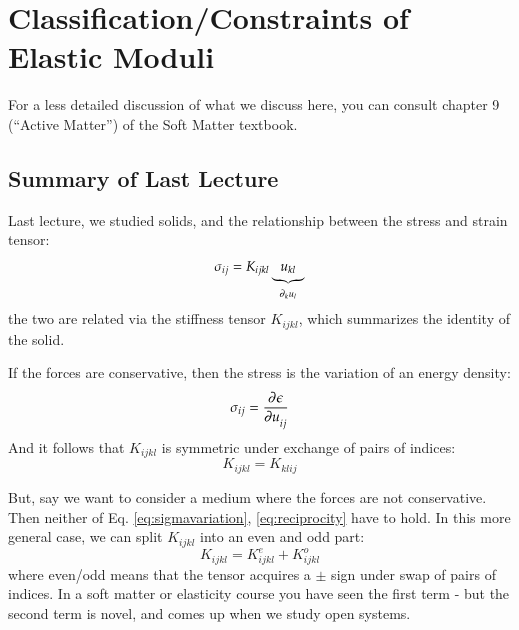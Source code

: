 \section{Classification/Constraints of Elastic Moduli}
For a less detailed discussion of what we discuss here, you can consult chapter 9 (``Active Matter'') of the Soft Matter textbook.

\subsection{Summary of Last Lecture}
Last lecture, we studied solids, and the relationship between the stress and strain tensor:
\begin{equation}
    \sigma_{ij} = K_{ijkl}\underbrace{u_{kl}}_{\partial_k u_l}
\end{equation}
the two are related via the stiffness tensor $K_{ijkl}$, which summarizes the identity of the solid.

If the forces are conservative, then the stress is the variation of an energy density:
\begin{equation}\label{eq:sigmavariation}
    \sigma_{ij} = \dpd{\e}{u_{ij}}
\end{equation}
And it follows that $K_{ijkl}$ is symmetric under exchange of pairs of indices:
\begin{equation}\label{eq:reciprocity}
    K_{ijkl} = K_{klij}
\end{equation}

But, say we want to consider a medium where the forces are not conservative. Then neither of Eq. \eqref{eq:sigmavariation}, \eqref{eq:reciprocity} have to hold. In this more general case, we can split $K_{ijkl}$ into an even and odd part:
\begin{equation}
    K_{ijkl} = K^e_{ijkl} + K^o_{ijkl}
\end{equation}
where even/odd means that the tensor acquires a $\pm$ sign under swap of pairs of indices. In a soft matter or elasticity course you have seen the first term - but the second term is novel, and comes up when we study open systems.

